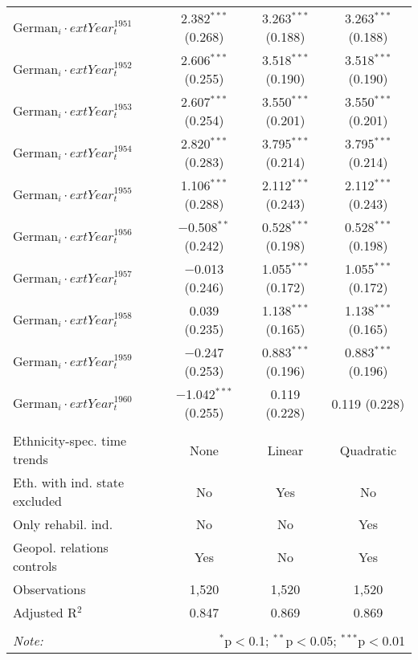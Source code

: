 \begin{table}[!h]
\begin{tabular}{@{\extracolsep{5pt}}lccc}
  $\text{German}_{i} \cdot 	ext{Year}_{t}^1951$ & 2.382$^{***}$ (0.268) & 3.263$^{***}$ (0.188) & 3.263$^{***}$ (0.188) \\ 
  $\text{German}_{i} \cdot 	ext{Year}_{t}^1952$ & 2.606$^{***}$ (0.255) & 3.518$^{***}$ (0.190) & 3.518$^{***}$ (0.190) \\ 
  $\text{German}_{i} \cdot 	ext{Year}_{t}^1953$ & 2.607$^{***}$ (0.254) & 3.550$^{***}$ (0.201) & 3.550$^{***}$ (0.201) \\ 
  $\text{German}_{i} \cdot 	ext{Year}_{t}^1954$ & 2.820$^{***}$ (0.283) & 3.795$^{***}$ (0.214) & 3.795$^{***}$ (0.214) \\ 
  $\text{German}_{i} \cdot 	ext{Year}_{t}^1955$ & 1.106$^{***}$ (0.288) & 2.112$^{***}$ (0.243) & 2.112$^{***}$ (0.243) \\ 
  $\text{German}_{i} \cdot 	ext{Year}_{t}^1956$ & $-$0.508$^{**}$ (0.242) & 0.528$^{***}$ (0.198) & 0.528$^{***}$ (0.198) \\ 
  $\text{German}_{i} \cdot 	ext{Year}_{t}^1957$ & $-$0.013 (0.246) & 1.055$^{***}$ (0.172) & 1.055$^{***}$ (0.172) \\ 
  $\text{German}_{i} \cdot 	ext{Year}_{t}^1958$ & 0.039 (0.235) & 1.138$^{***}$ (0.165) & 1.138$^{***}$ (0.165) \\ 
  $\text{German}_{i} \cdot 	ext{Year}_{t}^1959$ & $-$0.247 (0.253) & 0.883$^{***}$ (0.196) & 0.883$^{***}$ (0.196) \\ 
  $\text{German}_{i} \cdot 	ext{Year}_{t}^1960$ & $-$1.042$^{***}$ (0.255) & 0.119 (0.228) & 0.119 (0.228) \\ 
 \hline \\[-1.8ex] 
Ethnicity-spec. time trends & None & Linear & Quadratic \\ 
Eth. with ind. state excluded & No & Yes & No \\ 
Only rehabil. ind. & No & No & Yes \\ 
Geopol. relations controls & Yes & No & Yes \\ 
Observations & 1,520 & 1,520 & 1,520 \\ 
Adjusted R$^{2}$ & 0.847 & 0.869 & 0.869 \\ 
\hline 
\hline \\[-1.8ex] 
\textit{Note:}  & \multicolumn{3}{r}{$^{*}$p$<$0.1; $^{**}$p$<$0.05; $^{***}$p$<$0.01} \\ 
\end{tabular} 
\end{table} 
